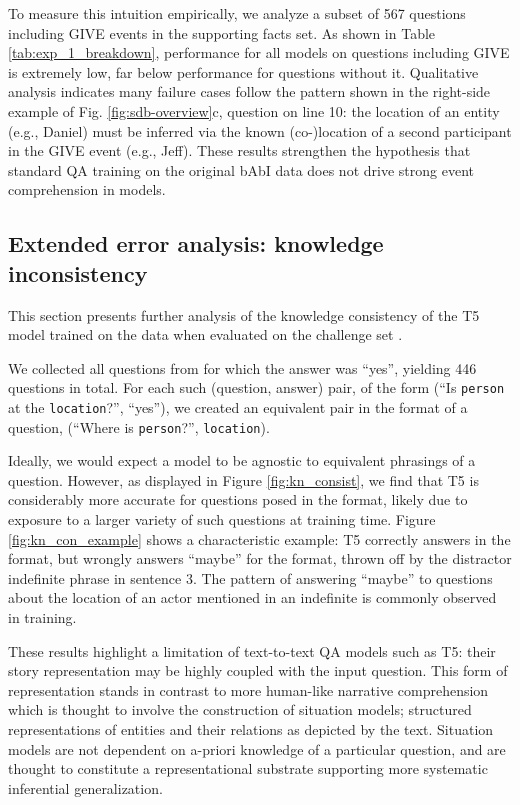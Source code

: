 

To measure this intuition empirically, we analyze a subset of 567 questions including GIVE events in the supporting facts set. As shown in Table \ref{tab:exp_1_breakdown}, performance for all models on questions including GIVE is extremely low, far below performance for questions without it. Qualitative analysis indicates many failure cases follow the pattern shown in the right-side example of Fig. \ref{fig:sdb-overview}c, question on line 10: the location of an entity (e.g., Daniel) must be inferred via the known (co-)location of a second participant in the GIVE event (e.g., Jeff). These results strengthen the hypothesis that standard QA training on the original bAbI data does not drive strong event comprehension in models.



\subsection{Extended error analysis: knowledge inconsistency}
\label{ssec:ext_err_analysis_know_incon}
This section presents further analysis of the knowledge consistency of the T5 model trained on the  data when evaluated on the challenge set .

We collected all \yesno questions from  for which the answer was ``yes'', yielding 446 questions in total. For each such (question, answer) pair, of the form (``Is \texttt{person} at the \texttt{location}?'', ``yes''), we created an equivalent pair in the format of a \wherep question, (``Where is \texttt{person}?'', \texttt{location}).

Ideally, we would expect a model to be agnostic to equivalent phrasings of a question. However, as displayed in Figure \ref{fig:kn_consist}, we find that T5 is considerably more accurate for questions posed in the \wherep format, likely due to exposure to a larger variety of such questions at training time. Figure \ref{fig:kn_con_example} shows a characteristic example: T5 correctly answers in the \wherep format, but wrongly answers ``maybe'' for the \yesno format, thrown off by the distractor indefinite phrase in sentence 3. The pattern of answering ``maybe'' to questions about the location of an actor mentioned in an indefinite is commonly observed in training.





These results highlight a limitation of text-to-text QA models such as T5: their story representation may be highly coupled with the input question. This form of representation stands in contrast to more human-like narrative comprehension which is thought to involve the construction of situation models;  structured representations of entities and their relations as depicted by the text. Situation models are not dependent on a-priori knowledge of a particular question, and are thought to constitute a representational substrate supporting more systematic inferential generalization.

